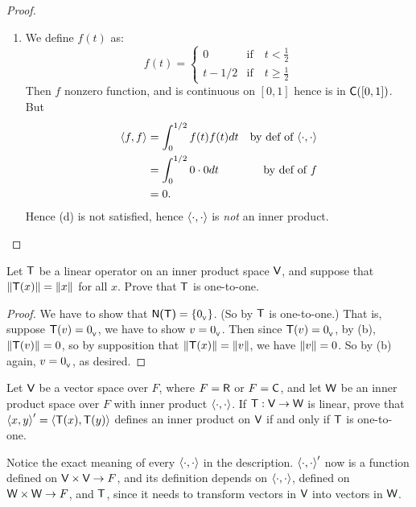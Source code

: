 \begin{proof}
\begin{enumerate}
\item
We define \(f(t)\) as:
\begin{equation*}
    f(t) = \begin{cases}
        0 & \text{if} \quad t < \frac{1}{2} \\
        t - 1/2 & \text{if} \quad t \ge \frac{1}{2}
    \end{cases}
\end{equation*}
Then \(f\) nonzero function, and is continuous on \([0, 1]\) hence is in \(\textsf{C}([0, 1])\).
But
\begin{align*}
    \left< f, f \right> & = \int_0^{1/2} f(t) f(t) dt & \text{by def of \(\left<\cdot, \cdot \right>\)} \\
        & = \int_0^{1/2} 0 \cdot 0 dt & \text{by def of \(f\)} \\
        & = 0.
\end{align*}
Hence (d) is not satisfied, hence \(\left< \cdot, \cdot \right>\) is \emph{not} an inner product.
\end{enumerate}
\end{proof}

\begin{exercise} \label{exercise 6.1.17}
Let \(\textsf{T}\) be a linear operator on an inner product space \(\textsf{V}\), and suppose that \(\left\lVert\textsf{T}(x)\right\rVert = \left\lVert x\right\rVert\) for all \(x\).
Prove that \(\textsf{T}\) is one-to-one.
\end{exercise}

\begin{proof}
We have to show that \(\textsf{N(T)} = \{ 0_{_{\textsf{V}}} \}\).
(So by  \(\textsf{T}\) is one-to-one.)
That is, suppose \(\textsf{T}(v) = 0_{_{\textsf{V}}}\), we have to show \(v = 0_{_{\textsf{V}}}\).
Then since \(\textsf{T}(v) = 0_{_{\textsf{V}}}\), by (b), \(\left\lVert\textsf{T}(v)\right\rVert = 0\), so by supposition that \(\left\lVert\textsf{T}(x)\right\rVert = \left\lVert v\right\rVert\), we have \(\left\lVert v\right\rVert = 0\).
So by (b) again, \(v = 0_{_{\textsf{V}}}\), as desired.
\end{proof}

\begin{exercise} \label{exercise 6.1.18}
Let \(\textsf{V}\) be a vector space over \(F\), where \(F = \textsf{R}\) or \(F = \textsf{C}\), and let \(\textsf{W}\) be an inner product space over \(F\) with inner product \(\left< \cdot, \cdot \right>\).
If \(\textsf{T} : \textsf{V} \to \textsf{W}\) is linear, prove that \(\left< x, y \right>' = \left< \textsf{T}(x), \textsf{T}(y) \right>\) defines an inner product on \(\textsf{V}\) if and only if \(\textsf{T}\) is one-to-one.
\end{exercise}

\begin{note}
Notice the exact meaning of every \(\left< \cdot, \cdot \right>\) in the description.
\(\left< \cdot, \cdot \right>'\) now is a function defined on \(\textsf{V} \times \textsf{V} \to F\), and its definition depends on  \(\left< \cdot, \cdot \right>\), defined on \(\textsf{W} \times \textsf{W} \to F\), and  \(\textsf{T}\), since it needs to transform vectors in \(\textsf{V}\) into vectors in \(\textsf{W}\).
\end{note}

